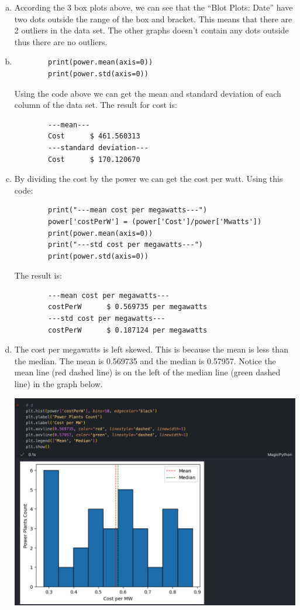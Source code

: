\documentclass{report}
\begin{document}
\begin{enumerate}[(a)]
    \item According the 3 box plots above, we can see that the ``Blot Plots: Date'' have two dots outside the range of the box and bracket. This means that there are 2 outliers in the data set. The other graphs doesn't contain any dots outside thus there are no outliers.
    \item \begin{verbatim}
        print(power.mean(axis=0))
        print(power.std(axis=0))
    \end{verbatim}
    Using the code above we can get the mean and standard deviation of each column of the data set. The result for cost is: 
    \begin{verbatim}
        ---mean---
        Cost      $ 461.560313 
        ---standard deviation---
        Cost      $ 170.120670
    \end{verbatim}
    \item By dividing the cost by the power we can get the cost per watt. Using this code:
    \begin{verbatim}
        print("---mean cost per megawatts---")
        power['costPerW'] = (power['Cost']/power['Mwatts'])
        print(power.mean(axis=0))
        print("---std cost per megawatts---")
        print(power.std(axis=0))
    \end{verbatim}
    The result is:
    \begin{verbatim}
        ---mean cost per megawatts---
        costPerW      $ 0.569735 per megawatts
        ---std cost per megawatts---
        costPerW      $ 0.187124 per megawatts
    \end{verbatim}
    \item The cost per megawatts is left skewed. This is because the mean is less than the median. The mean is 0.569735 and the median is 0.57957. Notice the mean line (red dashed line) is on the left of the median line (green dashed line) in the graph below.

    \includegraphics[scale=0.35]{q3d.png}

\end{enumerate}
\end{document}

